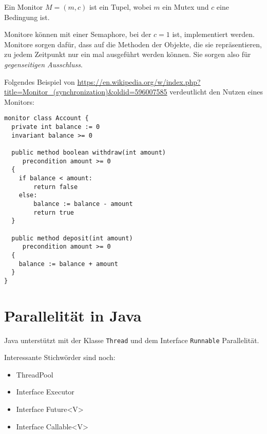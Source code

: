 \begin{definition}[Monitor]%
    Ein Monitor $M = (m, c)$ ist ein Tupel, wobei $m$ ein Mutex und $c$ eine 
    Bedingung ist.
\end{definition}

Monitore können mit einer Semaphore, bei der $c=1$ ist, implementiert werden. 
Monitore sorgen dafür, dass auf die Methoden der Objekte, die sie repräsentieren, 
zu jedem Zeitpunkt nur ein mal ausgeführt werden können. Sie sorgen also für
\textit{gegenseitigen Ausschluss}.

\begin{beispiel}[Monitor]
    Folgendes Beispiel von \url{https://en.wikipedia.org/w/index.php?title=Monitor_(synchronization)&oldid=596007585} verdeutlicht den Nutzen eines Monitors:

\begin{verbatim}
monitor class Account {
  private int balance := 0
  invariant balance >= 0

  public method boolean withdraw(int amount)
     precondition amount >= 0
  {
    if balance < amount:
        return false
    else:
        balance := balance - amount
        return true
  }

  public method deposit(int amount)
     precondition amount >= 0
  {
    balance := balance + amount
  }
}
\end{verbatim}
\end{beispiel}

\section{Parallelität in Java}
Java unterstützt mit der Klasse \texttt{Thread} und dem Interface \texttt{Runnable}
Parallelität.

Interessante Stichwörder sind noch:
\begin{itemize}
    \item ThreadPool
    \item Interface Executor
    \item Interface Future<V>
    \item Interface Callable<V>
\end{itemize}

